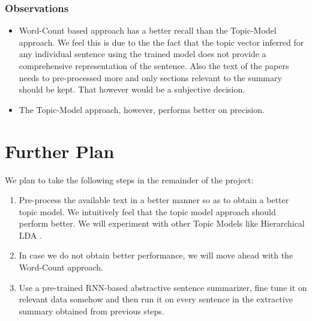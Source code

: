 \subsubsection{Observations}
\begin{itemize}
\item Word-Count based approach has a better recall than the Topic-Model approach. We feel this is due to the the fact that the topic vector inferred for any individual sentence using the trained model does not provide a comprehensive representation of the sentence. Also the text of the papers needs to pre-processed more and only sections relevant to the summary should be kept. That however would be a subjective decision.
\item The Topic-Model approach, however, performs better on precision. 
\end{itemize}
\section{Further Plan}
We plan to take the following steps in the remainder of the project:
\begin{enumerate}
\item Pre-process the available text in a better manner so as to obtain a better topic model. We intuitively feel that the topic model approach should perform better. We will experiment with other Topic Models like Hierarchical LDA \cite{teh2012hierarchical}.
\item In case we do not obtain better performance, we will move ahead with the Word-Count approach.
\item Use a pre-trained RNN-based abstractive sentence summarizer, fine tune it on relevant data somehow and then run it on every sentence in the extractive summary obtained from previous steps.
\end{enumerate}





